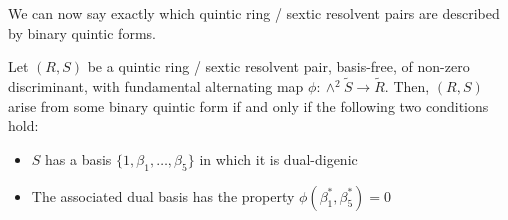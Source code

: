 \documentclass{report}
\begin{document}
We can now say exactly which quintic ring / sextic resolvent pairs are described by binary quintic forms.

\begin{theorem} \label{main theorem}
Let $(R,S)$ be a quintic ring / sextic resolvent pair, basis-free, of non-zero discriminant, with fundamental alternating map $\phi : \wedge^2 \tilde{S} \to \tilde{R}$.  Then, $(R,S)$ arise from some binary quintic form if and only if the following two conditions hold:
\begin{itemize}
\item $S$ has a basis $\{1,\beta_1,\ldots,\beta_5\}$ in which it is dual-digenic
\item The associated dual basis has the property $\phi (\beta_1^*,\beta_5^*) = 0$
\end{itemize}
\end{theorem}
\end{document}
